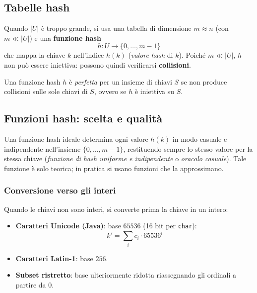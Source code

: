 \subsection{Tabelle hash}

Quando $|U|$ è troppo grande, si usa una tabella di dimensione $m \approx n$
(con $m \ll |U|$) e una \textbf{funzione hash}
\[
h : U \to \{0, \ldots, m-1\}
\]
che mappa la chiave $k$ nell'indice $h(k)$ (\emph{valore hash} di $k$).
Poiché $m \ll |U|$, $h$ non può essere iniettiva: possono quindi verificarsi
\textbf{collisioni}.

\begin{definizione}
	Una funzione hash $h$ è \emph{perfetta} per un insieme di chiavi $S$ se
	non produce collisioni sulle sole chiavi di $S$, ovvero se $h$ è iniettiva
	su $S$.
\end{definizione}

\subsection{Funzioni hash: scelta e qualità}

\begin{softnote}
	Una funzione hash ideale determina ogni valore $h(k)$ in modo casuale e
	indipendente nell'insieme $\{0,\ldots,m-1\}$, restituendo sempre lo stesso
	valore per la stessa chiave (\emph{funzione di hash uniforme e indipendente}
	o \emph{oracolo casuale}). Tale funzione è solo teorica; in pratica si usano
	funzioni che la approssimano.
\end{softnote}

\subsubsection{Conversione verso gli interi}

Quando le chiavi non sono interi, si converte prima la chiave in un intero:

\begin{itemize}
	\item \textbf{Caratteri Unicode (Java)}: base $65536$ (16 bit per
	\texttt{char}):
	\[
	k' = \sum_{i} c_i \cdot 65536^i
	\]
	\item \textbf{Caratteri Latin-1}: base $256$.
	\item \textbf{Subset ristretto}: base ulteriormente ridotta riassegnando
	gli ordinali a partire da $0$.
\end{itemize}

